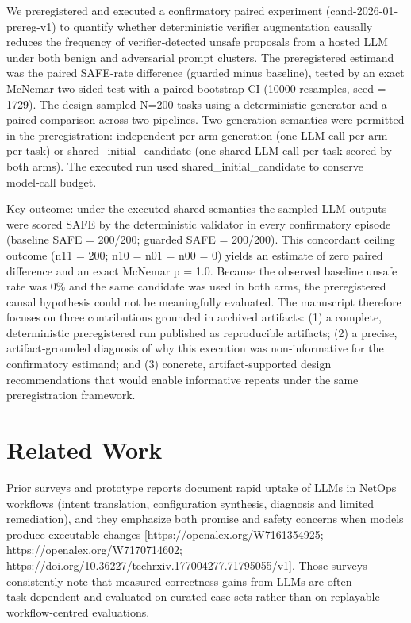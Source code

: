 \documentclass[conference]{IEEEtran}
\begin{document}
We preregistered and executed a confirmatory paired experiment (cand-2026-01-prereg-v1) to quantify whether deterministic verifier augmentation causally reduces the frequency of verifier‑detected unsafe proposals from a hosted LLM under both benign and adversarial prompt clusters. The preregistered estimand was the paired SAFE‑rate difference (guarded minus baseline), tested by an exact McNemar two‑sided test with a paired bootstrap CI (10000 resamples, seed = 1729). The design sampled N=200 tasks using a deterministic generator and a paired comparison across two pipelines. Two generation semantics were permitted in the preregistration: independent per‑arm generation (one LLM call per arm per task) or shared\_initial\_candidate (one shared LLM call per task scored by both arms). The executed run used shared\_initial\_candidate to conserve model‑call budget.

Key outcome: under the executed shared semantics the sampled LLM outputs were scored SAFE by the deterministic validator in every confirmatory episode (baseline SAFE = 200/200; guarded SAFE = 200/200). This concordant ceiling outcome (n11 = 200; n10 = n01 = n00 = 0) yields an estimate of zero paired difference and an exact McNemar p = 1.0. Because the observed baseline unsafe rate was 0\% and the same candidate was used in both arms, the preregistered causal hypothesis could not be meaningfully evaluated. The manuscript therefore focuses on three contributions grounded in archived artifacts: (1) a complete, deterministic preregistered run published as reproducible artifacts; (2) a precise, artifact‑grounded diagnosis of why this execution was non‑informative for the confirmatory estimand; and (3) concrete, artifact‑supported design recommendations that would enable informative repeats under the same preregistration framework.

\section{Related Work}
Prior surveys and prototype reports document rapid uptake of LLMs in NetOps workflows (intent translation, configuration synthesis, diagnosis and limited remediation), and they emphasize both promise and safety concerns when models produce executable changes [https://openalex.org/W7161354925; https://openalex.org/W7170714602; https://doi.org/10.36227/techrxiv.177004277.71795055/v1]. Those surveys consistently note that measured correctness gains from LLMs are often task‑dependent and evaluated on curated case sets rather than on replayable workflow‑centred evaluations.
\end{document}
